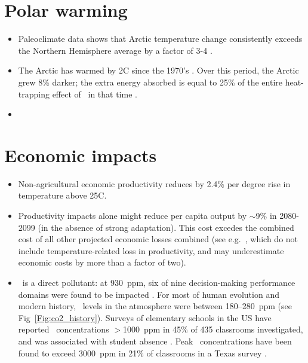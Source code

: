 \documentclass[11pt]{article}
\begin{document}
\section{Polar warming}
\begin{itemize}
\item Paleoclimate data shows that Arctic temperature change consistently exceeds the Northern Hemisphere average by a factor of 3-4 \cite{Miller10}.
\item The Arctic has warmed by 2\textdegree{}C since the 1970's \cite{Pistone14}. Over this period, the Arctic grew 8\% darker; the extra energy absorbed is equal to 25\% of the entire heat-trapping effect of \cotwo\ in that time \cite{Pistone14}.
\item 
\end{itemize}

\section{Economic impacts}
\begin{itemize}
\item Non-agricultural economic productivity reduces by 2.4\% per degree rise in temperature above 25\textdegree{}C\cite{Hsiang10}. 
\item Productivity impacts alone might reduce per capita output by $\sim$9\% in 2080-2099 (in the absence of strong adaptation).  This cost excedes the combined cost of all other projected economic losses combined \cite{Romm18,Hughes11} (see e.g.\  \cite{Stern06,Tol09}, which do not include temperature-related loss in productivity, and may underestimate economic costs by more than a factor of two).
\item \cotwo\ is a direct pollutant: at 930~ppm, six of nine decision-making performance domains were found to be impacted \cite{Allen15}. For most of human evolution and modern history, \cotwo\ levels in the atmosphere were between 180--280~ppm \cite{Romm18} (see Fig~\ref{Fig:co2_history}). Surveys of elementary schools in the US have reported \cotwo\ concentrations $>$1000~ppm in 45\% of 435 classrooms investigated, and was associated with student absence \cite{Corsi02,Allen15}. Peak \cotwo\ concentrations have been found to exceed 3000~ppm in 21\% of classrooms in a Texas survey \cite{Corsi02}.
\end{itemize}
\end{document}
